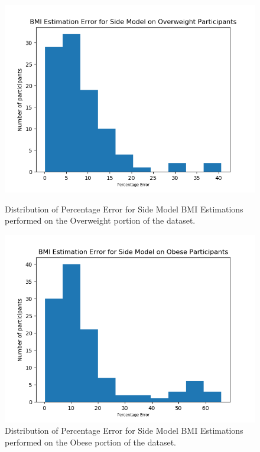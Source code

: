 \documentclass[conference]{IEEEtran}
\begin{document}
\begin{figure}[H]
    \centering
    \begin{minipage}[b]{0.35\textwidth}
    \includegraphics[width=\linewidth]{sideovererror.png}
    \caption{Distribution of Percentage Error for Side Model BMI Estimations performed on the Overweight portion of the dataset.}
    \label{fig:sideovererror}
    \end{minipage}
    \hspace{1cm}
    \begin{minipage}[b]{0.35\textwidth}
    \includegraphics[width=\linewidth]{sideobeseerror.png}
    \caption{Distribution of Percentage Error for Side Model BMI Estimations performed on the Obese portion of the dataset.}
    \label{fig:sideobeseerror}
    \end{minipage}
\end{figure}
\end{document}

